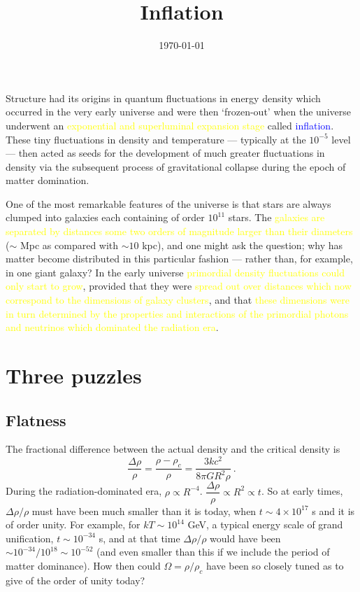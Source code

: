 \documentclass[12pt,a4paper]{article}
\title{Inflation}
\author{}
\date{\today}
\begin{document}
\maketitle

\cite{perkins2008particle} Structure had its origins in quantum fluctuations in energy density which occurred in the very early universe and were then `frozen-out' when the universe underwent an \textcolor{yellow}{exponential and superluminal expansion stage} called \textcolor{blue}{inflation}. These tiny fluctuations in density and temperature --- typically at the $10^{-5}$ level --- then acted as seeds for the development of much greater fluctuations in density via the subsequent process of gravitational collapse during the epoch of matter domination.

One of the most remarkable features of the universe is that stars are always clumped into galaxies each containing of order $10^{11}$ stars. The \textcolor{yellow}{galaxies are separated by distances some two orders of magnitude larger than their diameters} ($\sim$ Mpc as compared with $\sim 10$ kpc), and one might ask the question; why has matter become distributed in this particular fashion --- rather than, for example, in one giant galaxy? In the early universe \textcolor{yellow}{primordial density fluctuations could only start to grow}, provided that they were \textcolor{yellow}{spread out over distances which now correspond to the dimensions of galaxy clusters}, and that \textcolor{yellow}{these dimensions were in turn determined by the properties and interactions of the primordial photons and neutrinos which dominated the radiation era}.

\section{Three puzzles}

\subsection{Flatness}
\cite{2008cosm.book.....W}

\cite{ryden2016introduction}



\cite{perkins2008particle} The fractional difference between the actual density and the critical density is
\begin{equation}
\dfrac{\Delta \rho}{\rho} = \dfrac{\rho -\rho_c}{\rho} = \dfrac{3k c^2}{8\pi G R^2 \rho} ~.
\end{equation}
During the radiation-dominated era, $\rho \propto R^{-4}$. $\dfrac{\Delta \rho}{\rho} \propto R^2 \propto t$. So at early times, $\Delta \rho/\rho$ must have been much smaller than it is today, when $t \sim 4 \times 10^{17}$ s and it is of order unity. For example, for $kT \sim 10^{14}$ GeV, a typical energy scale of grand unification, $t \sim 10^{-34}$ s, and at that time $\Delta \rho/\rho$ would have been $\sim 10^{-34}/10^{18} \sim 10^{-52}$ (and even smaller than
this if we include the period of matter dominance). How then could $\Omega = \rho/\rho_c$ have been so closely tuned as to give of the order of unity today?
\end{document}
